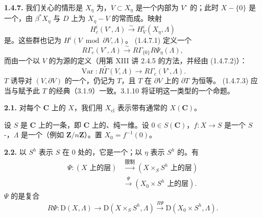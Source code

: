 \textbf{1.4.7.} 我们关心的情形是 $X_\eta$ 为，$V\subset X_\eta$ 是一个内部为 $V^\circ$ 的；此时 $X-\{0\}$ 是一个，由 $\beta^*X_\eta$ 与 $D$ 上为 $X_\eta-V$ 的常而成。映射
\[
 H_c^i(V^\circ,\Lambda)\xrightarrow{\sim}H_V^i(X_\eta,\Lambda)\tag{1.4.7.1}
\]
是。这些群也记为 $H^i(V\bmod\partial V,\Lambda)$。 (1.4.7.1) 定义一个
\[
 R\Gamma_c(V^\circ,\Lambda)\xrightarrow{\sim}
 R\Gamma_{\{0\}}R\Psi_\eta(\Lambda),\tag{1.4.7.2}
\]
而由一个以 $V$ 的为源的定义（用第 XIII 讲 2.4.5 的方法，并经由 (1.4.7.2)）：
\[
 \operatorname{Var}:R\widetilde\Gamma(V,\Lambda)\longrightarrow
 R\Gamma_c(V^\circ,\Lambda).\tag{1.4.7.3}
\]
$T$ 诱导对 $(V,\partial V)$ 的一个，仍记为 $T$，且 $T$ 在 $\partial V$ 上的 $\partial T$ 为恒等。 (1.4.7.3) 应当与赋予此 $T$ 的经典（3.1.9）一致。3.1.10 将证明这一类型的一个命题。


\textbf{2.1.} 对每个 $\mathbf C$ 上的 $X$，我们用 $X_{\mathrm{cl}}$ 表示带有通常的 $X(\mathbf C)$。

设 $S$ 是 $\mathbf C$ 上的一条，即 $\mathbf C$ 上的、纯一维。设 $0\in S(\mathbf C)$，$f:X\to S$ 是一个 $S$-，$\Lambda$ 是一个（例如 $\mathbf Z/n\mathbf Z$）。置 $X_0=f^{-1}(0)$。

\textbf{2.2.} 以 $S^h$ 表示 $S$ 在 $0$ 处的，它是一个；以 $\eta$ 表示 $S^h$ 的。有
\[
 \begin{aligned}
 \Psi:(X\text{ 上的层})&\xrightarrow{\text{限制}}(X\times_S S^h\text{ 上的层})\\
 &\xrightarrow{\Psi}(X_0\times S^h\text{ 上的层}).
 \end{aligned}
\]
$\Psi$ 的是复合
\[
 R\Psi:\mathrm D(X,\Lambda)\longrightarrow\mathrm D(X\times_S S^h,\Lambda)
 \xrightarrow{R\Psi}\mathrm D(X_0\times S^h,\Lambda).
\]

